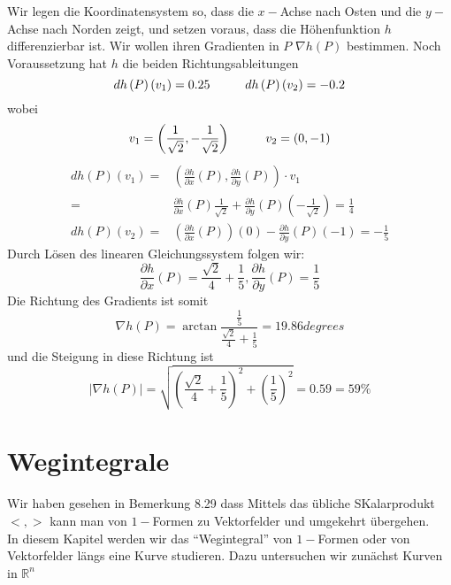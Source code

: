 \begin{enumerate}
Wir legen die Koordinatensystem so, dass die $x-$Achse nach Osten und die $y-$Achse nach Norden zeigt, und setzen voraus, dass die Höhenfunktion $h$ differenzierbar ist. Wir wollen ihren Gradienten in $P$ $\nabla h(P)$ bestimmen. Noch Voraussetzung hat $h$ die beiden Richtungsableitungen $$dh\left( P\right)\left( v_1\right)=0.25\hspace{10mm}dh\left( P\right)\left(  v_2\right)=-0.2$$ wobei $$v_1=\left( \frac{1}{\sqrt{2}},-\frac{1}{\sqrt{2}}\right)\hspace{10mm}v_2=(0,-1)$$
\begin{align*}
dh \left( P\right) \left( v_1\right) = &\left( \frac{\partial h}{\partial x}\left(P\right), \frac{\partial h}{\partial y}\left(P\right)\right)\cdot v_1\\
= & \frac{\partial h}{\partial x}\left(P\right)\frac{1}{\sqrt{2}} +\frac{\partial h}{\partial y}\left( P\right) \left(-\frac{1}{\sqrt{2}}\right) = \frac{1}{4}\\
dh \left( P\right) \left( v_2\right) = &\left( \frac{\partial h}{\partial x}\left(P\right)\right) (0) - \frac{\partial h}{\partial y}\left(P\right)(-1)=-\frac{1}{5}
\end{align*}
Durch Lösen des linearen Gleichungssystem folgen wir: 
$$\frac{\partial h}{\partial x}\left( P\right) = \frac{\sqrt{2}}{4}+\frac{1}{5}, \frac{\partial h}{\partial y}\left( P\right) = \frac{1}{5}$$
Die Richtung des Gradients ist somit $$ \nabla h\left( P \right) = \arctan{\frac{\frac{1}{5}}{\frac{\sqrt{2}}{4}+ \frac{1}{5}}}=19.86 degrees$$
und die Steigung in diese Richtung ist 
$$\left| \nabla h\left( P\right) \right| = \sqrt{\left( \frac{\sqrt{2}}{4}+\frac{1}{5}\right)^2 + \left( \frac{1}{5}\right)^2} = 0.59 = 59\%$$ 
\end{enumerate}

\section{Wegintegrale}
Wir haben gesehen in Bemerkung 8.29 dass Mittels das übliche SKalarprodukt $<,>$ kann man von $1-$Formen zu Vektorfelder und umgekehrt übergehen. \\

In diesem Kapitel werden wir das ``Wegintegral'' von $1-$Formen oder  von Vektorfelder längs eine Kurve studieren. Dazu untersuchen wir zunächst Kurven in $\mathbb{R}^n$

